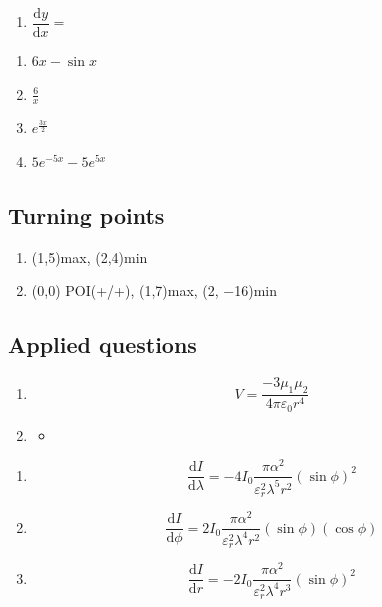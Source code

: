 \documentclass[
]{book}
\providecommand{\tightlist}{%
  \setlength{\itemsep}{0pt}\setlength{\parskip}{0pt}}
\begin{document}
\begin{enumerate}
\def\labelenumi{\arabic{enumi}.}
\setcounter{enumi}{1}
\tightlist
\item
  \(\dfrac{\textrm{d}y}{\textrm{d}x}=\)
\end{enumerate}

\begin{enumerate}
\def\labelenumi{\alph{enumi}.}
\tightlist
\item
  \(6x-\sin x\)
\item
  \(\frac{6}{x}\)
\item
  \(e^{\frac{3x}{2}}\)
\item
  \(5e^{-5x}-5e^{5x}\)
\end{enumerate}

\hypertarget{turning-points-1}{%
\subsection{Turning points}\label{turning-points-1}}

\begin{enumerate}
\def\labelenumi{\arabic{enumi}.}
\tightlist
\item
  (1,5)max, (2,4)min
\item
  (0,0) POI(+/+), (1,7)max, (2, −16)min
\end{enumerate}

\hypertarget{applied-questions-1}{%
\subsection{Applied questions}\label{applied-questions-1}}

\begin{enumerate}
\def\labelenumi{\arabic{enumi}.}
\item
  \begin{equation*}
  V = \frac{-3 \mu_1 \mu_2}{4 \pi \varepsilon_0 r^4}
  \end{equation*}
\item
  \begin{itemize}
  \item
  \end{itemize}
\end{enumerate}

\begin{enumerate}
\def\labelenumi{\alph{enumi}.}
\tightlist
\item
  \begin{equation*}
  \dfrac{\textrm{d}I}{\textrm{d}\lambda}= -4I_0 \frac{\pi \alpha ^2}{\varepsilon _r^2 \lambda^5 r^2}(\sin \phi)^2
  \end{equation*}
\item
  \begin{equation*}
  \dfrac{\textrm{d}I}{\textrm{d}\phi}= 2I_0 \frac{\pi \alpha ^2}{\varepsilon _r^2 \lambda^4 r^2}(\sin \phi)(\cos \phi)
  \end{equation*}
\item
  \begin{equation*}
  \dfrac{\textrm{d}I}{\textrm{d}r}= -2I_0 \frac{\pi \alpha ^2}{\varepsilon _r^2 \lambda^4 r^3}(\sin \phi)^2
  \end{equation*}
\end{enumerate}
\end{document}
